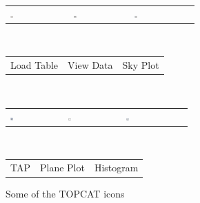 \documentclass[twocolumn,apj]{openjournal}
\begin{document}
\begin{figure}[htbp]
\begin{center}
\begin{tabular}{p{2cm}p{2cm}p{2cm}}
\hspace*{0.75em}\includegraphics[width=0.05\textwidth]{load-table.png}
& \includegraphics[width=0.05\textwidth]{view-data.png}
& \includegraphics[width=0.05\textwidth]{skyplot-icon.png}
\end{tabular}\\
\begin{tabular}{p{2cm}p{2cm}p{2cm}}
\scriptsize Load Table &\scriptsize  View Data
& \scriptsize  Sky Plot 
\end{tabular}\\[0.5em]
 \begin{tabular}{p{2cm}p{2cm}p{2cm}}
\hspace*{0.75em}\includegraphics[width=0.05\textwidth]{tap-icon.png}
& \includegraphics[width=0.05\textwidth]{plane-plot-icon.png}
& \includegraphics[width=0.05\textwidth]{histogram-icon.png}
\end{tabular}\\
\begin{tabular}{p{2cm}p{2cm}p{2cm}}
\hspace*{0.75em}\scriptsize \hspace*{0.5em}TAP
&\scriptsize Plane Plot
& \scriptsize Histogram
\end{tabular}
\caption{Some of the TOPCAT icons}
\label{TOPCATIcons}
\end{center}
\end{figure}
\end{document}
